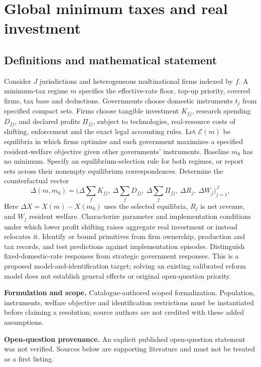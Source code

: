 \documentclass[11pt]{article}
\begin{document}
\section*{Global minimum taxes and real investment}\label{30007757}
\subsection{Definitions and mathematical statement}
Consider \(J\) jurisdictions and heterogeneous multinational firms indexed by \(f\). A minimum-tax regime \(m\) specifies the effective-rate floor, top-up priority, covered firms, tax base and deductions. Governments choose domestic instruments \(t_j\) from specified compact sets. Firms choose tangible investment \(K_{fj}\), research spending \(D_{fj}\), and declared profits \(\Pi_{fj}\), subject to technologies, real-resource costs of shifting, enforcement and the exact legal accounting rules. Let \(\mathcal E(m)\) be equilibria in which firms optimize and each government maximizes a specified resident-welfare objective given other governments' instruments. Baseline \(m_0\) has no minimum. Specify an equilibrium-selection rule for both regimes, or report sets across their nonempty equilibrium correspondences. Determine the counterfactual vector
\[\Delta(m,m_0)=\big(\Delta\sum_f K_{fj},\ \Delta\sum_f D_{fj},\ \Delta\sum_f\Pi_{fj},\ \Delta R_j,\ \Delta W_j\big)_{j=1}^J,\]
Here \(\Delta X=X(m)-X(m_0)\) uses the selected equilibria, \(R_j\) is net revenue, and \(W_j\) resident welfare. Characterize parameter and implementation conditions under which lower profit shifting raises aggregate real investment or instead relocates it. Identify or bound primitives from firm ownership, production and tax records, and test predictions against implementation episodes. Distinguish fixed-domestic-rate responses from strategic government responses. This is a proposed model-and-identification target; solving an existing calibrated reform model does not establish general effects or original open-question priority.

\par\textbf{Formulation and scope.} Catalogue-authored scoped formalization. Population, instruments, welfare objective and identification restrictions must be instantiated before claiming a resolution; source authors are not credited with these added assumptions.

\par\textbf{Open-question provenance.} An explicit published open-question statement was not verified. Sources below are supporting literature and must not be treated as a first listing.
\end{document}
